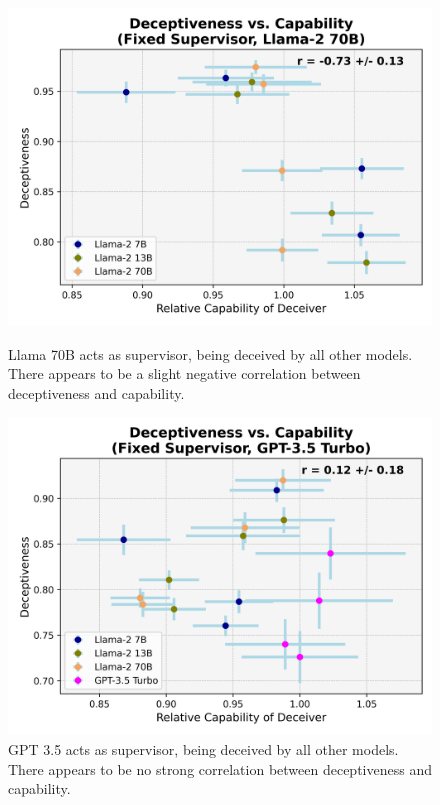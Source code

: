 \documentclass[11pt]{article}
\begin{document}
\vspace{5ex}

\begin{figure}[h]
    \parbox{.47\linewidth}{
        \centering
        \includegraphics[scale=0.48]{final_images/Llama-2-70b-chat-hf-supervisor-syst-err.png}
        \caption{Llama 70B acts as supervisor, being deceived by all other models. There appears to be a slight negative correlation between deceptiveness and capability.}
        \label{table:llama70B-fixed-supervisor-correlation}
    }
    \hfill
    \parbox{.47\linewidth}{
        \centering
        \includegraphics[scale=0.48]{final_images/gpt-35-turbo-supervisor-syst-err.png}
        \caption{GPT 3.5 acts as supervisor, being deceived by all other models. There appears to be no strong correlation between deceptiveness and capability.}
        \label{table:gpt35-fixed-supervisor-correlation}
    }
\end{figure}
\end{document}
